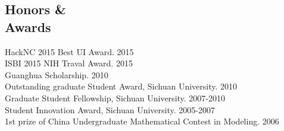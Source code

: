 \documentclass[line,margin]{res}
\begin{document}
\begin{resume}
		
		
		
		\section{\sc Honors \& \\Awards}
		
		HackNC 2015 Best UI Award.   \hfill            2015\\
		ISBI 2015 NIH Traval Award. \hfill      2015\\
		Guanghua Scholarship.  \hfill       2010\\
		Outstanding graduate Student Award, Sichuan University. \hfill       2010\\
		Graduate Student Fellowship, Sichuan University.  \hfill       2007-2010\\
		Student Innovation Award, Sichuan University.  \hfill        2005-2007 \\%
		1st prize of China Undergraduate Mathematical Contest in Modeling.  \hfill       2006
		
		
		
	\end{resume}
	
\end{document}
